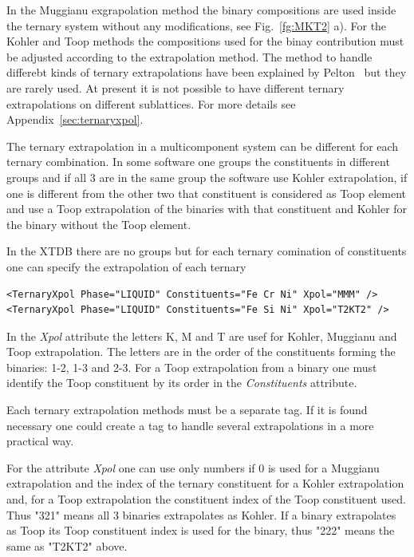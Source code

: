 \documentclass{article}
\begin{document}
\begin{appendices}
In the Muggianu exgrapolation method the binary compositions are used
inside the ternary system without any modifications, see
Fig.~\ref{fg:MKT2} a).  For the Kohler and Toop methods the
compositions used for the binay contribution must be adjusted
according to the extrapolation method.  The method to handle differebt
kinds of ternary extrapolations have been explained by
Pelton~\cite{01Pel} but they are rarely used.  At present it is not
possible to have different ternary extrapolations on different
sublattices.  For more details see Appendix~\ref{sec:ternaryxpol}.

The ternary extrapolation in a multicomponent system can be different
for each ternary combination.  In some software one groups the
constituents in different groups and if all 3 are in the same group
the software use Kohler extrapolation, if one is different from the
other two that constituent is considered as Toop element and use a
Toop extrapolation of the binaries with that constituent and Kohler
for the binary without the Toop element.

In the XTDB there are no groups but for each ternary comination of
constituents one can specify the extrapolation of each ternary

\begin{verbatim}
<TernaryXpol Phase="LIQUID" Constituents="Fe Cr Ni" Xpol="MMM" />
<TernaryXpol Phase="LIQUID" Constituents="Fe Si Ni" Xpol="T2KT2" />
\end{verbatim}

In the {\em Xpol} attribute the letters K, M and T are usef for
Kohler, Muggianu and Toop extrapolation.  The letters are in the order
of the constituents forming the binaries: 1-2, 1-3 and 2-3.  For a
Toop extrapolation from a binary one must identify the Toop
constituent by its order in the {\em Constituents} attribute.

Each ternary extrapolation methods must be a separate tag.  If it is
found necessary one could create a tag to handle several
extrapolations in a more practical way.

For the attribute {\em Xpol} one can use only numbers if 0 is used
for a Muggianu extrapolation and the index of the ternary constituent
for a Kohler extrapolation and, for a Toop extrapolation the
constituent index of the Toop constituent used.  Thus "321" means all
3 binaries extrapolates as Kohler.  If a binary extrapolates as Toop
its Toop constituent index is used for the binary, thus "222" means
the same as "T2KT2" above.


\end{appendices}
\end{document}
